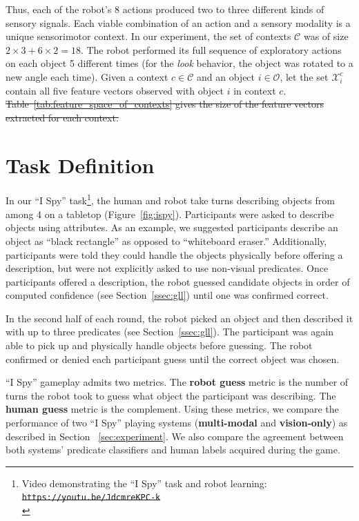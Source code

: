 \documentclass{article}
\newcommand{\ispy}{``I Spy''\xspace}
\providecommand{\DIFadd}[1]{{\protect\color{blue}\uwave{#1}}} %
\providecommand{\DIFdel}[1]{{\protect\color{red}\sout{#1}}}                      %
\providecommand{\DIFaddbegin}{} %
\providecommand{\DIFaddend}{} %
\providecommand{\DIFdelbegin}{} %
\providecommand{\DIFdelend}{} %
\begin{document}
Thus, each of the robot's 8 actions produced two to three different kinds of sensory signals.
Each viable combination of an action and a sensory modality is a unique sensorimotor context.
In our experiment, the set of contexts $\mathcal{C}$ was of size  $2 \times 3 + 6 \times 2 = 18$.
The robot performed its full sequence of exploratory actions on each object 5 different times (for the {\it look} behavior, the object was rotated to a new angle each time). Given a context $c \in \mathcal{C}$ and an object $i \in \mathcal{O}$, let the set $\mathcal{X}_i^c$ contain all five feature vectors observed with object $i$ in context $c$.
\DIFdelbegin \DIFdel{Table~\ref{tab:feature_space_of_contexts} gives the size of the feature vectors extracted for each context.
}\DIFdelend 

\section{Task Definition}
\label{sec:taskdefinition}
In our \ispy task\footnote{Video demonstrating the \ispy task and robot learning: \DIFdelbegin \texttt{\DIFdel{https://youtu.be/JdcmreKPC-k}}%
\DIFdelend \DIFaddbegin \texttt{\DIFadd{https://youtu.be/jLHzRXPCi}\\\DIFadd{SUBSCRIPTNB}{\DIFadd{w}}}\DIFaddend }, the human and robot take turns describing objects from among 4 on a tabletop (Figure~\ref{fig:ispy}).
Participants were asked to describe objects using attributes.
As an example, we suggested participants describe an object as ``black rectangle'' as opposed to ``whiteboard eraser.''
Additionally, participants were told they could handle the objects physically before offering a description, but were not explicitly asked to use non-visual predicates.
Once participants offered a description, the robot guessed candidate objects in order of computed confidence (see Section~\ref{ssec:gll}) until one was confirmed correct.

In the second half of each round, the robot picked an object and then described it with up to three predicates (see Section~\ref{ssec:gll}).
The participant was again able to pick up and physically handle objects before guessing.
The robot confirmed or denied each participant guess until the correct object was chosen.

\ispy gameplay admits two metrics.
The \textbf{robot guess} metric is the number of turns the robot took to guess what object the participant was describing.
The \textbf{human guess} metric is the complement.
Using these metrics, we compare the performance of two \ispy playing systems (\textbf{multi-modal} and \textbf{vision-only}) as described in Section ~\ref{sec:experiment}.
We also compare the agreement between both systems' predicate classifiers and human labels acquired during the game.
\end{document}
